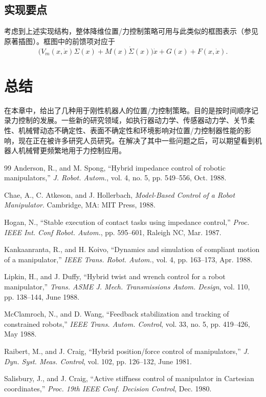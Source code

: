 \documentclass[12pt,a4paper]{ctexart}
\begin{document}
\subsection{实现要点}

考虑到上述实现结构，整体降维位置/力控制策略可用与此类似的框图表示（参见原著插图）。框图中的前馈项对应于
\begin{equation}\label{eq:9.5.32}
\bigl(V_m(x,\dot{x})\Sigma(x) + M(x)\dot{\Sigma}(x)\bigr)\dot{x} + G(x) + F(x,\dot{x}).
\end{equation}

\section{总结}\label{sec:9.6}

在本章中，给出了几种用于刚性机器人的位置/力控制策略。目的是按时间顺序记录力控制的发展。一些新的研究领域，如执行器动力学、传感器动力学、关节柔性、机械臂动态不确定性、表面不确定性和环境影响对位置/力控制器性能的影响，现在正在被许多研究人员研究。在解决了其中一些问题之后，可以期望看到机器人机械臂更频繁地用于力控制应用。

\begin{thebibliography}{99}
 Anderson, R., and M. Spong, ``Hybrid impedance control of robotic manipulators,'' \textit{J. Robot. Autom.}, vol. 4, no. 5, pp. 549--556, Oct. 1988.

 Chae, A., C. Atkeson, and J. Hollerbach, \textit{Model-Based Control of a Robot Manipulator}. Cambridge, MA: MIT Press, 1988.

 Hogan, N., ``Stable execution of contact tasks using impedance control,'' \textit{Proc. IEEE Int. Conf Robot. Autom.}, pp. 595--601, Raleigh NC, Mar. 1987.

 Kankaanranta, R., and H. Koivo, ``Dynamics and simulation of compliant motion of a manipulator,'' \textit{IEEE Trans. Robot. Autom.}, vol. 4, pp. 163--173, Apr. 1988.

 Lipkin, H., and J. Duffy, ``Hybrid twist and wrench control for a robot manipulator,'' \textit{Trans. ASME J. Mech. Transmissions Autom. Design}, vol. 110, pp. 138--144, June 1988.

 McClamroch, N., and D. Wang, ``Feedback stabilization and tracking of constrained robots,'' \textit{IEEE Trans. Autom. Control}, vol. 33, no. 5, pp. 419--426, May 1988.

 Raibert, M., and J. Craig, ``Hybrid position/force control of manipulators,'' \textit{J. Dyn. Syst. Meas. Control}, vol. 102, pp. 126--132, June 1981.

 Salisbury, J., and J. Craig, ``Active stiffness control of manipulator in Cartesian coordinates,'' \textit{Proc. 19th IEEE Conf. Decision Control}, Dec. 1980.
\end{thebibliography}
\end{document}
